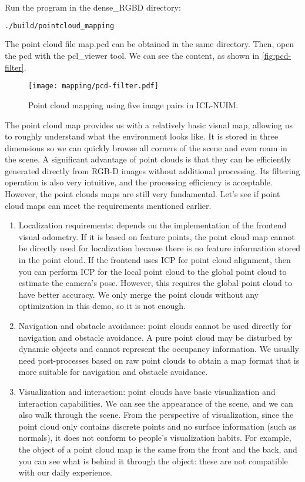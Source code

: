 Run the program in the dense\_RGBD directory:
\begin{lstlisting}[language=sh, caption=Terminal input:]
./build/pointcloud_mapping
\end{lstlisting}
The point cloud file map.pcd can be obtained in the same directory. Then, open the pcd with the pcl\_viewer tool. We can see the content, as shown in \autoref{fig:pcd-filter}.

\begin{figure}[!ht]
	\centering
	\texttt{[image: mapping/pcd-filter.pdf]}
	\caption{Point cloud mapping using five image pairs in ICL-NUIM.}
	\label{fig:pcd-filter}
\end{figure}

The point cloud map provides us with a relatively basic visual map, allowing us to roughly understand what the environment looks like. It is stored in three dimensions so we can quickly browse all corners of the scene and even roam in the scene. A significant advantage of point clouds is that they can be efficiently generated directly from RGB-D images without additional processing. Its filtering operation is also very intuitive, and the processing efficiency is acceptable. However, the point clouds maps are still very fundamental. Let's see if point cloud maps can meet the requirements mentioned earlier.

\begin{enumerate}
	\item Localization requirements: depends on the implementation of the frontend visual odometry. If it is based on feature points, the point cloud map cannot be directly used for localization because there is no feature information stored in the point cloud. If the frontend uses ICP for point cloud alignment, then you can perform ICP for the local point cloud to the global point cloud to estimate the camera's pose. However, this requires the global point cloud to have better accuracy. We only merge the point clouds without any optimization in this demo, so it is not enough.
	\item Navigation and obstacle avoidance: point clouds cannot be used directly for navigation and obstacle avoidance. A pure point cloud may be disturbed by dynamic objects and cannot represent the occupancy information. We usually need post-processes based on raw point clouds to obtain a map format that is more suitable for navigation and obstacle avoidance.
	\item Visualization and interaction: point clouds have basic visualization and interaction capabilities. We can see the appearance of the scene, and we can also walk through the scene. From the perspective of visualization, since the point cloud only contains discrete points and no surface information (such as normals), it does not conform to people's visualization habits. For example, the object of a point cloud map is the same from the front and the back, and you can see what is behind it through the object: these are not compatible with our daily experience.
\end{enumerate}


